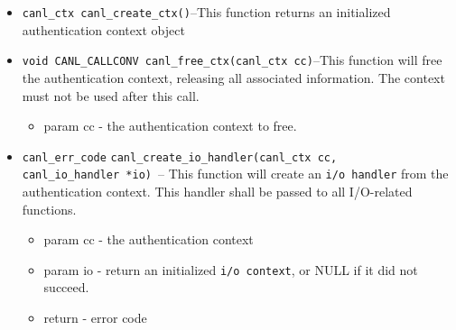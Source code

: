 \begin{itemize}
  \item \verb'canl_ctx canl_create_ctx()'--This function
  returns an initialized authentication context object
  \item \verb'void CANL_CALLCONV canl_free_ctx(canl_ctx cc)'--This
  function will free the authentication context, releasing 
  all associated information.  The context must not be used after this call.
  \begin{itemize}
    \item param cc - the authentication context to free.
  \end{itemize}
  \item \verb'canl_err_code'
  \verb'canl_create_io_handler(canl_ctx cc, canl_io_handler *io)' -- 
  This function will create an \verb'i/o handler' from the authentication 
  context. This handler shall be passed to all I/O-related functions.
  \begin{itemize}
    \item param cc - the authentication context
    \item param io -  return an initialized \verb'i/o context', or NULL if 
    it did not succeed.
    \item return - \CANL error code
  \end{itemize}


\end{itemize}
